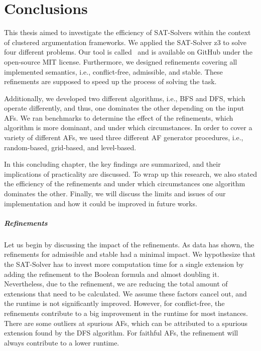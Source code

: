\chapter{Conclusions}
This thesis aimed to investigate the efficiency of SAT-Solvers within the context of clustered argumentation frameworks. We applied the SAT-Solver z3 to solve four different problems. Our tool is called \prog\ and is available on GitHub under the open-source MIT license. Furthermore, we designed refinements covering all implemented semantics, i.e., conflict-free, admissible, and stable. These refinements are supposed to speed up the process of solving the task.

Additionally, we developed two different algorithms, i.e., BFS and DFS, which operate differently, and thus, one dominates the other depending on the input AFs. We ran benchmarks to determine the effect of the refinements, which algorithm is more dominant, and under which circumstances. In order to cover a variety of different AFs, we used three different AF generator procedures, i.e., random-based, grid-based, and level-based.

In this concluding chapter, the key findings are summarized, and their implications of practicality are discussed. To wrap up this research, we also stated the efficiency of the refinements and under which circumstances one algorithm dominates the other. Finally, we will discuss the limits and issues of our implementation and how it could be improved in future works.

\paragraph{Refinements} Let us begin by discussing the impact of the refinements. As data has shown, the refinements for admissible and stable had a minimal impact. We hypothesize that the SAT-Solver has to invest more computation time for a single extension by adding the refinement to the Boolean formula and almost doubling it. Nevertheless, due to the refinement, we are reducing the total amount of extensions that need to be calculated. We assume these factors cancel out, and the runtime is not significantly improved. However, for conflict-free, the refinements contribute to a big improvement in the runtime for most instances. There are some outliers at spurious AFs, which can be attributed to a spurious extension found by the DFS algorithm. For faithful AFs, the refinement will always contribute to a lower runtime.


